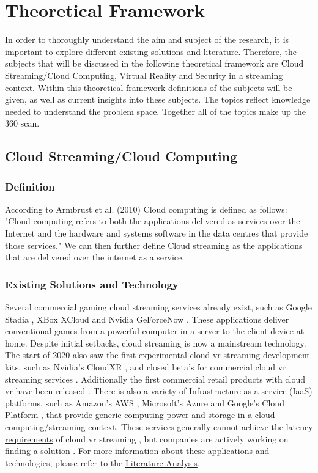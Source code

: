 
\section{Theoretical Framework}

In order to thoroughly understand the aim and subject of the research, it is important to explore different existing solutions and literature. Therefore, the subjects that will be discussed in the following theoretical framework are Cloud Streaming/Cloud Computing, Virtual Reality and Security in a streaming context. Within this theoretical framework definitions of the subjects will be given, as well as current insights into these subjects. The topics reflect knowledge needed to understand the problem space. Together all of the topics make up the 360 scan.

\subsection{Cloud Streaming/Cloud Computing}

\subsubsection{Definition}
According to Armbrust et al. (2010) Cloud computing is defined as follows: 
"Cloud computing refers to both the applications delivered as services over the Internet and the hardware and systems software in the data centres that provide those services." \parencite{aviewoncc}
We can then further define Cloud streaming as the applications that are delivered over the internet as a service.

\subsubsection{Existing Solutions and Technology}
Several commercial gaming cloud streaming services already exist, such as Google Stadia \parencite{stadia}, XBox XCloud \parencite{xcloud} and Nvidia GeForceNow \parencite{geforcenow}. These applications deliver conventional games from a powerful computer in a server to the client device at home. Despite initial setbacks, cloud streaming is now a mainstream technology. The start of 2020 also saw the first experimental cloud \acrshort{vr} streaming development kits, such as Nvidia's CloudXR \parencite{cloudxr}, and closed beta's for commercial cloud \acrshort{vr} streaming services \parencite{shadowvr}. Additionally the first commercial retail products with cloud \acrshort{vr} have been released \parencite{zerolight5g}. There is also a variety of Infrastructure\hyp{}as\hyp{}a\hyp{}service (IaaS) platforms, such as Amazon's AWS \parencite{aws}, Microsoft's Azure \parencite{azure} and Google's Cloud Platform \parencite{gcp}, that provide generic computing power and storage in a cloud computing/streaming context. These services generally cannot achieve the \hyperref[ssec:vrphy]{latency requirements} of cloud \acrshort{vr} streaming \parencite{survey_IRSS}, but companies are actively working on finding a solution \parencite{awswavelength}. For more information about these applications and technologies, please refer to the \hyperref[sec:lit]{Literature Analysis}.


